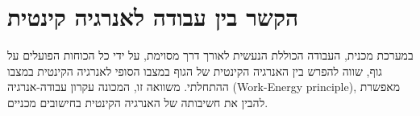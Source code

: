 \documentclass[a4paper]{book}
\begin{document}
\section{הקשר בין עבודה לאנרגיה קינטית}\label{E}

במערכת מכנית, העבודה הכוללת הנעשית
לאורך דרך מסוימת, על ידי כל הכוחות
הפועלים על גוף, שווה להפרש בין האנרגיה
הקינטית של הגוף במצבו הסופי לאנרגיה
הקינטית במצבו ההתחלתי. משוואה זו,
המכונה עקרון עבודה-אנרגיה (Work-Energy
principle), מאפשרת להבין את חשיבותה של
האנרגיה הקינטית בחישובים מכניים.
\end{document}
